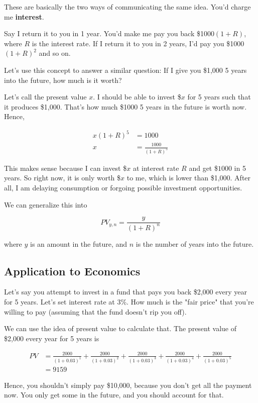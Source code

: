 \documentclass[11pt]{scrartcl}
\begin{document}
These are basically the two ways of communicating the same idea. You'd charge me \textbf{interest}.

Say I return it to you in 1 year. You'd make me pay you back \$1000$(1+R)$, where $R$ is the interest rate. If I return it to you in 2 years, I'd pay you \$1000$(1+R)^2$ and so on.

Let's use this concept to answer a similar question: If I give you \$1,000 5 years into the future, how much is it worth?

Let's call the present value $x$. I should be able to invest \$$x$ for 5 years such that it produces \$1,000. That's how much \$1000 5 years in the future is worth now. Hence,

\begin{align*}
x(1+R)^5 &= 1000 \\
x &= \frac{1000}{(1+R)^5}
\end{align*}

This makes sense because I can invest \$$x$ at interest rate $R$ and get \$$1000$ in 5 years. So right now, it is only worth \$$x$ to me, which is lower than \$1,000. After all, I am delaying consumption or forgoing possible investment opportunities.

We can generalize this into

\[ PV_{y,n} = \frac{y}{(1+R)^n} \]

where $y$ is an amount in the future, and $n$ is the number of years into the future.

\subsection{Application to Economics}
Let's say you attempt to invest in a fund that pays you back \$2,000 every year for 5 years. Let's set interest rate at 3\%. How much is the "fair price" that you're willing to pay (assuming that the fund doesn't rip you off). 

We can use the idea of present value to calculate that. The present value of \$2,000 every year for 5 years is

\begin{align*}
PV &= \frac{2000}{(1+0.03)^1} + \frac{2000}{(1+0.03)^2} + \frac{2000}{(1+0.03)^3} + \frac{2000}{(1+0.03)^4} + \frac{2000}{(1+0.03)^5} \\
&= 9159
\end{align*}

Hence, you shouldn't simply pay \$10,000, because you don't get all the payment now. You only get some in the future, and you should account for that.
\end{document}
